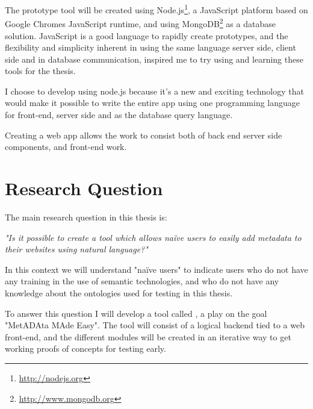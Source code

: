The prototype tool will be created using Node.js\footnote{\url{http://nodejs.org}},
a JavaScript platform based on Google Chromes JavaScript runtime,
and using MongoDB\footnote{\url{http://www.mongodb.org}} as a database solution.
JavaScript is a good language to rapidly create prototypes, and the flexibility and simplicity inherent in using the same language
server side, client side and in database communication, inspired me to try using and learning these tools for the thesis.

%

I choose to develop using node.js because it's a new and exciting technology that would make it possible to write
the entire app using one programming language for front-end, server side and as the database query language.

Creating a web app allows the work to consist both of back end server side components, and front-end work.


\section{Research Question}
The main research question in this thesis is:

\emph{"Is it possible to create a tool which allows naïve users to easily add metadata to their websites using natural language?"}

In this context we will understand "naïve users" to indicate users who do not have any training in the use of semantic technologies,
and who do not have any knowledge about the ontologies used for testing in this thesis.

To answer this question I will develop a tool called \theartefact, a play on the goal "MetADAta MAde Easy".
The tool will consist of a logical backend tied to a web front-end,
and the different modules will be created in an iterative way to get working proofs of concepts for testing early.

